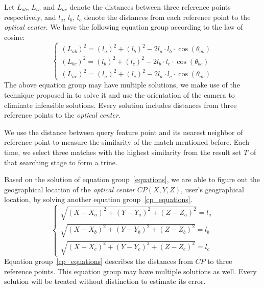 Let $L_{ab}$, $L_{bc}$ and $L_{ac}$ denote the distances between three reference points respectively, and $l_a$, $l_b$, $l_c$ denote the distances from each reference point to the \emph{optical center}.
We have the following equation group according to the law of cosine:
\begin{equation}
\label{equations}
\left\{
\begin{array}{l}
(L_{ab})^2 = (l_a)^2 + (l_b)^2 - 2 l_a\cdot l_b\cdot \cos(\theta_{ab})  \\
(L_{bc})^2 = (l_b)^2 + (l_c)^2 - 2 l_b\cdot l_c\cdot \cos(\theta_{bc}) \\
(L_{ac})^2 = (l_a)^2 + (l_c)^2 - 2 l_a\cdot l_c\cdot \cos(\theta_{ac})
\end{array}
\right.
\end{equation}
The above equation group may have multiple solutions,
we make use of the technique proposed in \cite{fischler1981random} to solve it and use the orientation of the camera to eliminate infeasible solutions. Every solution includes distances from three reference points to the \emph{optical center}.

We use the distance between query feature point and its nearest neighbor of reference point to measure the similarity of the match mentioned before. Each time, we select three matches with the highest similarity from the result set $T$ of that searching stage to form a trine.

Based on the solution of equation group~\ref{equations}, we are able to figure out the geographical location of the \emph{optical center} $CP(X,Y,Z)$, \ie user's geographical location, by solving another equation group~\ref{cp_equations}.
\begin{equation}
\label{cp_equations}
\left\{
\begin{array}{l}
\sqrt{(X-X_a)^2+(Y-Y_a)^2+(Z-Z_a)^2} = l_a  \\
\sqrt{(X-X_b)^2+(Y-Y_b)^2+(Z-Z_b)^2} = l_b \\
\sqrt{(X-X_c)^2+(Y-Y_c)^2+(Z-Z_c)^2} = l_c
\end{array}
\right.
\end{equation}
Equation group~\ref{cp_equations} describes the distances from $CP$ to three reference points. This equation group may have multiple solutions as well. Every solution will be treated without distinction to estimate its error.

